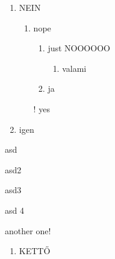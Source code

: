 \documentclass{article}
\begin{document}
\begin{enumerate}[label=(\arabic*)]
\item NEIN
\begin{enumerate}[label=(\arabic*)]
\item nope
\begin{enumerate}[label=(\arabic*)]
\item just NOOOOOO
\begin{enumerate}[label=(\arabic*)]
\item valami
\end{enumerate}
\item ja
\end{enumerate}
\item[!] yes
\end{enumerate}
\item igen
\end{enumerate}

\hulipsum[1]

\begin{enuma}
\item asd
\begin{enuma}
\item asd2
\begin{enuma}
\item asd3
\begin{enuma}
\item asd 4
\begin{enuma}
\item another one!
\end{enuma}
\end{enuma}
\end{enuma}
\end{enuma}
\end{enuma}

\hulipsum[2]

\begin{enumerate}[resume]
\item KETTŐ
\end{enumerate}
\end{document}
